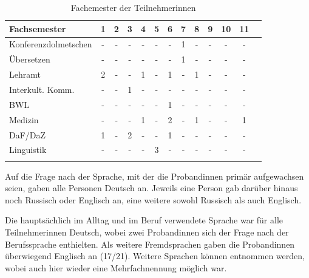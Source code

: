 \begin{table}
    
    \begin{tabular}{lcccccccccccc}
	\lsptoprule
		{Fachsemester} & {1} & {2} & {3} & {4} & {5} & {6} & {7} & {8} & {9} & {10} & {11}\\ 
	\midrule
		Konferenzdolmetschen & - & - & - & - & - & - & 1 & - & - & - & - \\ 
		Übersetzen & - & - & - & - & - & - & 1 & - & - & - & - \\ 
		Lehramt & 2 & - & - & 1 & - & 1 & - & 1 & - & - & - \\ 
		Interkult. Komm. & - & - & 1 & - & - & - & - & - & - & - & - \\ 
		BWL & - & - & - & - & - & 1 & - & - & - & - & - \\
		Medizin & - & - & - & 1 & - & 2 & - & 1 & - & - & 1 \\ 
		DaF/DaZ & 1 & - & 2 & - & - & 1 & - & - & - & - & - \\ 
		Linguistik & - & - & - & - & 3 & - & - & - & - & - & - \\ 
	\lspbottomrule
	\end{tabular}
	\caption{Fachemester der Teilnehmer{\textperiodcentered}innen\label{K6:tab:Semester_TN-Feldstudie-CatDe}}
\end{table}

Auf die Frage nach der Sprache, mit der die Proband{\textperiodcentered}innen primär aufgewachsen seien, gaben alle Personen Deutsch an. Jeweils eine Person gab darüber hinaus noch Russisch oder Englisch an, eine weitere sowohl Russisch als auch Englisch. 

Die hauptsächlich im Alltag und im Beruf verwendete Sprache war für alle Teilnehmer{\textperiodcentered}innen Deutsch, wobei zwei Proband{\textperiodcentered}innen sich der Frage nach der Berufssprache enthielten. Als weitere Fremdsprachen gaben die Proband{\textperiodcentered}innen überwiegend Englisch an (17/21). Weitere Sprachen können  entnommen werden, wobei auch hier wieder eine Mehrfachnennung möglich war.
  


